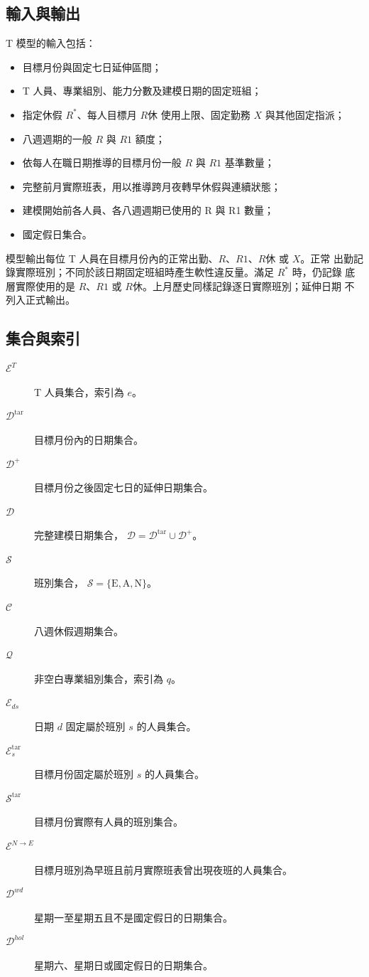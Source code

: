 \documentclass[a4paper,12pt]{article}
\begin{document}
\subsection{輸入與輸出}

T 模型的輸入包括：
\begin{itemize}
  \item 目標月份與固定七日延伸區間；
  \item T 人員、專業組別、能力分數及建模日期的固定班組；
  \item 指定休假 \(R^*\)、每人目標月 \(R休\) 使用上限、固定勤務 \(X\) 與其他固定指派；
  \item 八週週期的一般 \(R\) 與 \(R1\) 額度；
  \item 依每人在職日期推導的目標月份一般 \(R\) 與 \(R1\) 基準數量；
  \item 完整前月實際班表，用以推導跨月夜轉早休假與連續狀態；
  \item 建模開始前各人員、各八週週期已使用的 R 與 R1 數量；
  \item 國定假日集合。
\end{itemize}

模型輸出每位 T 人員在目標月份內的正常出勤、\(R\)、\(R1\)、\(R休\) 或 \(X\)。正常
出勤記錄實際班別；不同於該日期固定班組時產生軟性違反量。滿足 \(R^*\) 時，仍記錄
底層實際使用的是 \(R\)、\(R1\) 或 \(R休\)。上月歷史同樣記錄逐日實際班別；延伸日期
不列入正式輸出。

\subsection{集合與索引}

\begin{description}
  \item[\(\mathcal{E}^{T}\)] T 人員集合，索引為 \(e\)。
  \item[\(\mathcal{D}^{\mathrm{tar}}\)] 目標月份內的日期集合。
  \item[\(\mathcal{D}^{+}\)] 目標月份之後固定七日的延伸日期集合。
  \item[\(\mathcal{D}\)] 完整建模日期集合，
    \(\mathcal{D}=\mathcal{D}^{\mathrm{tar}}\cup\mathcal{D}^{+}\)。
  \item[\(\mathcal{S}\)] 班別集合，
    \(\mathcal{S}=\{\mathrm{E},\mathrm{A},\mathrm{N}\}\)。
  \item[\(\mathcal{C}\)] 八週休假週期集合。
  \item[\(\mathcal{Q}\)] 非空白專業組別集合，索引為 \(q\)。
  \item[\(\mathcal{E}_{ds}\)] 日期 \(d\) 固定屬於班別 \(s\) 的人員集合。
  \item[\(\mathcal{E}^{\mathrm{tar}}_s\)] 目標月份固定屬於班別 \(s\) 的人員集合。
  \item[\(\mathcal{S}^{\mathrm{tar}}\)] 目標月份實際有人員的班別集合。
  \item[\(\mathcal{E}^{N\rightarrow E}\)] 目標月班別為早班且前月實際班表曾出現夜班的人員集合。
  \item[\(\mathcal{D}^{wd}\)] 星期一至星期五且不是國定假日的日期集合。
  \item[\(\mathcal{D}^{hol}\)] 星期六、星期日或國定假日的日期集合。
\end{description}
\end{document}
